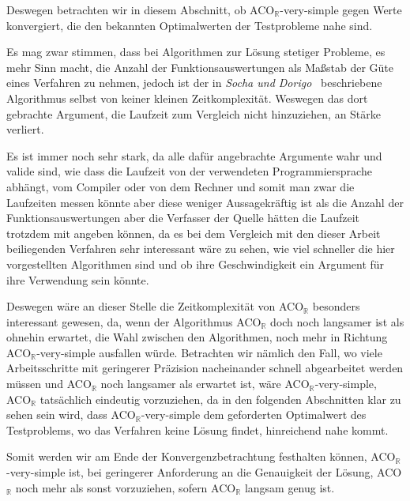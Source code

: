 \documentclass[fontsize=12, a4aper]{scrartcl}
\begin{document}
	Deswegen betrachten wir in diesem Abschnitt, ob ACO\(_{\mathbb{R}}\)-very-simple gegen Werte konvergiert, die den bekannten Optimalwerten der Testprobleme nahe sind.\hfill\newline
	
	Es mag zwar stimmen, dass bei Algorithmen zur Lösung stetiger Probleme, es mehr Sinn macht, die Anzahl der Funktionsauswertungen als Maßstab der Güte eines Verfahren zu nehmen, jedoch ist der in \textit{Socha und Dorigo}~\cite{socha2008ant} beschriebene Algorithmus selbst von keiner kleinen Zeitkomplexität. Weswegen das dort gebrachte Argument, die Laufzeit zum Vergleich nicht hinzuziehen, an Stärke verliert.\hfill\newline
	
	Es ist immer noch sehr stark, da alle dafür angebrachte Argumente wahr und valide sind, wie dass die Laufzeit von der verwendeten Programmiersprache abhängt, vom Compiler oder von dem Rechner und somit man zwar die Laufzeiten messen könnte aber diese weniger Aussagekräftig ist als die Anzahl der Funktionsauswertungen aber die Verfasser der Quelle hätten die Laufzeit trotzdem mit angeben können, da es bei dem Vergleich mit den dieser Arbeit beiliegenden Verfahren sehr interessant wäre zu sehen, wie viel schneller die hier vorgestellten Algorithmen sind und ob ihre Geschwindigkeit ein Argument für ihre Verwendung sein könnte.\hfill\newline
	
	Deswegen wäre an dieser Stelle die Zeitkomplexität von ACO\(_{\mathbb{R}}\) besonders interessant gewesen, da, wenn der Algorithmus ACO\(_{\mathbb{R}}\) doch noch langsamer ist als ohnehin erwartet, die Wahl zwischen den Algorithmen, noch mehr in Richtung ACO\(_{\mathbb{R}}\)-very-simple ausfallen würde. Betrachten wir nämlich den Fall, wo viele Arbeitsschritte mit geringerer Präzision nacheinander schnell abgearbeitet werden müssen und ACO\(_{\mathbb{R}}\) noch langsamer als erwartet ist, wäre ACO\(_{\mathbb{R}}\)-very-simple, ACO\(_{\mathbb{R}}\) tatsächlich eindeutig vorzuziehen, da in den folgenden Abschnitten klar zu sehen sein wird, dass ACO\(_{\mathbb{R}}\)-very-simple dem geforderten Optimalwert des Testproblems, wo das Verfahren keine Lösung findet, hinreichend nahe kommt.\hfill\newline
	
	Somit werden wir am Ende der Konvergenzbetrachtung festhalten können, ACO\(_{\mathbb{R}}\)-very-simple ist, bei geringerer Anforderung an die Genauigkeit der Lösung, ACO\(_{\mathbb{R}}\) noch mehr als sonst vorzuziehen, sofern ACO\(_{\mathbb{R}}\) langsam genug ist.
	
\end{document}

